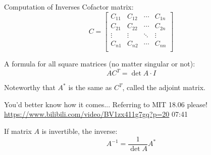 \documentclass{beamer}
\begin{document}
\begin{frame}{Computation of Inverses}
Cofactor matrix:
\begin{equation*}
    C=\left[ \begin{matrix}
        C_{11}&		C_{12}&		\cdots&		C_{1n}\\
        C_{21}&		C_{22}&		\cdots&		C_{2n}\\
        \vdots&		\vdots&		\ddots&		\vdots\\
        C_{n1}&		C_{n2}&		\cdots&		C_{nn}\\
    \end{matrix} \right]
\end{equation*}


A formula for all square matrices (no matter singular or not):
\begin{equation*}
    AC^T=\det A \cdot I
\end{equation*}

Noteworthy that $A^*$ is the same as $C^T$, called the adjoint matrix.

\vspace{3pt}
You'd better know how it comes... Referring to MIT 18.06 please!
\url{https://www.bilibili.com/video/BV1zx411g7gq?p=20} 07:41

\vspace{3pt}
If matrix $A$ is invertible, the inverse:
\begin{equation*}
    A^{-1}=\frac{1}{\det A}A^*
\end{equation*}

\end{frame}
\end{document}
